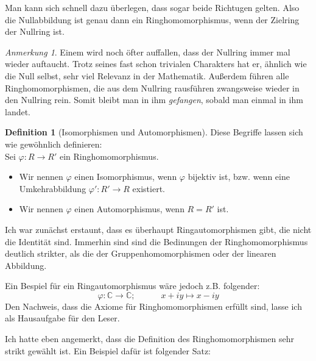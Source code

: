 \documentclass{article}
\theoremstyle{definition}
\newtheorem*{definition}{Definition}
\theoremstyle{remark}
\newtheorem*{anm}{Anmerkung}
\begin{document}
\vspace{0.7em}
Man kann sich schnell dazu überlegen, dass sogar beide
Richtugen gelten. Also die Nullabbildung ist genau dann ein Ringhomomorphismus, wenn der Zielring der Nullring
ist.

\begin{anm}
Einem wird noch öfter auffallen, dass der Nullring immer mal wieder auftaucht. Trotz seines fast schon
trivialen Charakters hat er, ähnlich wie die Null selbst, sehr viel Relevanz in der Mathematik. Außerdem führen
alle Ringhomomorphismen, die aus dem Nullring rausführen zwangsweise wieder in den Nullring rein. Somit bleibt
man in ihm \emph{gefangen}, sobald man einmal in ihm landet.
\end{anm}

\begin{definition}[Isomorphismen und Automorphismen] Diese Begriffe lassen sich wie gewöhnlich definieren: \\
Sei $\varphi: R\to R'$ ein Ringhomomorphismus.
\begin{itemize}
    \item Wir nennen $\varphi$ einen Isomorphismus, wenn $\varphi$ bijektiv ist, bzw. wenn eine Umkehrabbildung     $\varphi': R'\to R$ existiert. 
    \item Wir nennen $\varphi$ einen Automorphismus, wenn $R=R'$ ist.
\end{itemize}

\end{definition}

Ich war zunächst erstaunt, dass es überhaupt Ringautomorphismen gibt, die nicht die Identität sind. Immerhin
sind sind die Bedinungen der Ringhomomorphismus deutlich strikter, als die der Gruppenhomomorphismen oder der 
linearen Abbildung.

Ein Bespiel für ein Ringautomorphismus wäre jedoch z.B. folgender:
\[\varphi: \mathbb C\to\mathbb C; \hspace{3em} x+iy \longmapsto x-iy\]
Den Nachweis, dass die Axiome für Ringhomomorphismen erfüllt sind, lasse ich als Hausaufgabe für den Leser.

\vspace{0.7em}
Ich hatte eben angemerkt, dass die Definition des Ringhomomorphismen sehr strikt gewählt ist. Ein Beispiel
dafür ist folgender Satz:
\end{document}

